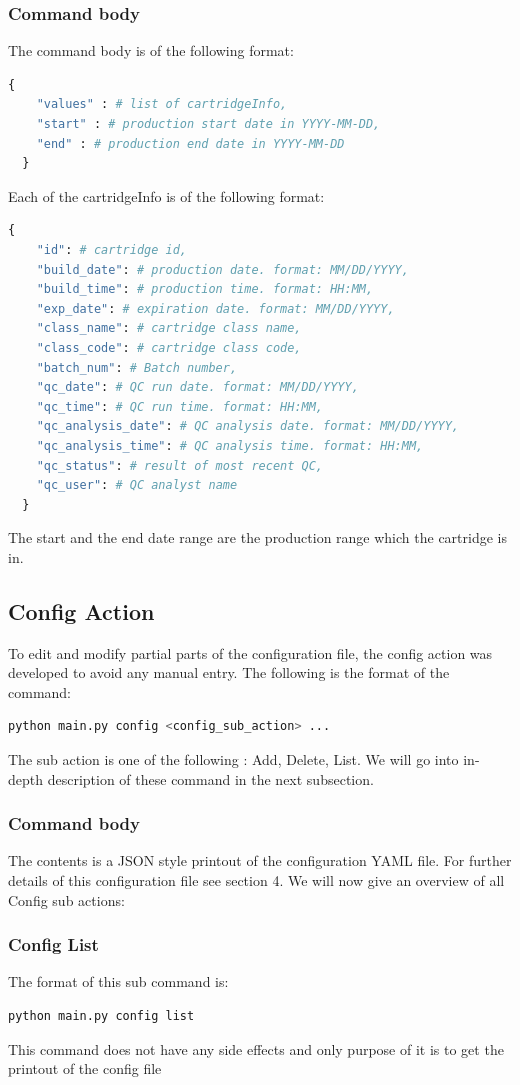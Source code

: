 \documentclass[12pt,a4paper]{article}
\begin{document}
\subsubsection{Command body}
The command body is of the following format:
\begin{lstlisting}[language=python]
  {
    "values" : # list of cartridgeInfo,
    "start" : # production start date in YYYY-MM-DD,
    "end" : # production end date in YYYY-MM-DD
  }
\end{lstlisting}
Each of the cartridgeInfo is of the following format:
\begin{lstlisting}[language=python]
  {
    "id": # cartridge id,
    "build_date": # production date. format: MM/DD/YYYY,
    "build_time": # production time. format: HH:MM,
    "exp_date": # expiration date. format: MM/DD/YYYY,
    "class_name": # cartridge class name,
    "class_code": # cartridge class code,
    "batch_num": # Batch number,
    "qc_date": # QC run date. format: MM/DD/YYYY,
    "qc_time": # QC run time. format: HH:MM,
    "qc_analysis_date": # QC analysis date. format: MM/DD/YYYY,
    "qc_analysis_time": # QC analysis time. format: HH:MM,
    "qc_status": # result of most recent QC,
    "qc_user": # QC analyst name
  }
\end{lstlisting}
The start and the end date range are the production range which the cartridge is in.

\subsection{Config Action}
To edit and modify partial parts of the configuration file, the config action was developed to avoid any manual entry. The
following is the format of the command:
\begin{lstlisting}[language=bash]
  python main.py config <config_sub_action> ...
\end{lstlisting}
The sub action is one of the following : Add, Delete, List. We will go into in-depth description of these command in the next subsection.
\subsubsection{Command body}
The contents is a JSON style printout of the configuration YAML file. For further details of this configuration file see section 4. \newline
\newline
We will now give an overview of all Config sub actions:
\subsubsection{Config List}
The format of this sub command is:
\begin{lstlisting}[language=bash]
  python main.py config list
\end{lstlisting}
This command does not have any side effects and only purpose of it is to get the printout of the config file
\end{document}
